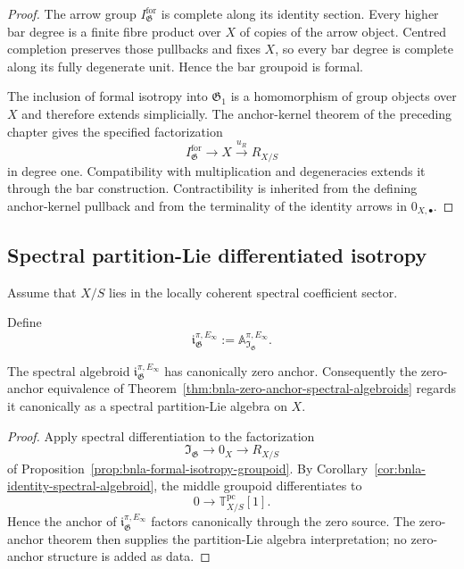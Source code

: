 \begin{proof}
The arrow group $I^{\mathrm{for}}_{\mathfrak G}$ is complete along its
identity section.  Every higher bar degree is a finite fibre product over
$X$ of copies of the arrow object.  Centred completion preserves those
pullbacks and fixes $X$, so every bar degree is complete along its fully
degenerate unit.  Hence the bar groupoid is formal.

The inclusion of formal isotropy into $\mathfrak G_1$ is a homomorphism of
group objects over $X$ and therefore extends simplicially.  The
anchor-kernel theorem of the preceding chapter gives the specified
factorization
\[
    I^{\mathrm{for}}_{\mathfrak G}
    \longrightarrow
    X
    \xrightarrow{u_R}
    R_{X/S}
\]
in degree one.  Compatibility with multiplication and degeneracies extends
it through the bar construction.  Contractibility is inherited from the
defining anchor-kernel pullback and from the terminality of the identity
arrows in $0_{X,\bullet}$.
\end{proof}

\subsection{Spectral partition-Lie differentiated isotropy}

Assume that $X/S$ lies in the locally coherent spectral coefficient sector.

\begin{definition}
\label{def:bnla-spectral-differentiated-isotropy}
Define
\[
\boxed{
    \mathfrak i^{\pi,E_\infty}_{\mathfrak G}
    :=
    \mathbb A^{\pi,E_\infty}_{\mathfrak I_{\mathfrak G}}.}
\]
\end{definition}

\begin{proposition}
\label{prop:bnla-spectral-isotropy-zero-anchor}
The spectral algebroid
$\mathfrak i^{\pi,E_\infty}_{\mathfrak G}$ has canonically zero anchor.
Consequently the zero-anchor equivalence of
Theorem~\ref{thm:bnla-zero-anchor-spectral-algebroids} regards it canonically
as a spectral partition-Lie algebra on $X$.
\end{proposition}

\begin{proof}
Apply spectral differentiation to the factorization
\[
    \mathfrak I_{\mathfrak G}
    \longrightarrow
    0_X
    \longrightarrow
    R_{X/S}
\]
of Proposition~\ref{prop:bnla-formal-isotropy-groupoid}.  By
Corollary~\ref{cor:bnla-identity-spectral-algebroid}, the middle groupoid
differentiates to
\[
    0\longrightarrow\mathbb T^{\mathrm{pc}}_{X/S}[1].
\]
Hence the anchor of
$\mathfrak i^{\pi,E_\infty}_{\mathfrak G}$ factors canonically through the
zero source.  The zero-anchor theorem then supplies the partition-Lie
algebra interpretation; no zero-anchor structure is added as data.
\end{proof}


